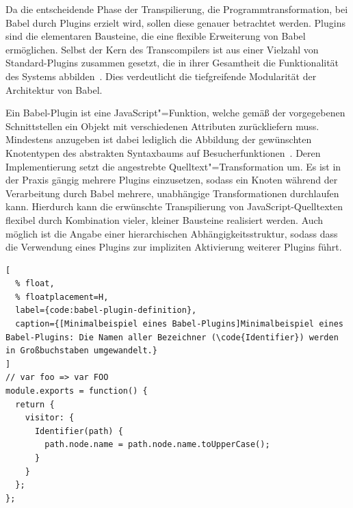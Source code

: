 Da die entscheidende Phase der Transpilierung, die Programmtransformation, bei Babel durch Plugins erzielt wird, sollen diese genauer betrachtet werden. Plugins sind die elementaren Bausteine, die eine flexible Erweiterung von Babel ermöglichen. Selbst der Kern des Transcompilers ist aus einer Vielzahl von Standard-Plugins zusammen gesetzt, die in ihrer Gesamtheit die Funktionalität des Systems abbilden~\autocite{BABEL}. Dies verdeutlicht die tiefgreifende Modularität der Architektur von Babel.

Ein Babel-Plugin ist eine JavaScript"=Funktion, welche gemäß der vorgegebenen Schnittstellen ein Objekt mit verschiedenen Attributen zurückliefern muss. Mindestens anzugeben ist dabei lediglich die Abbildung der gewünschten Knotentypen des abstrakten Syntaxbaums auf Besucherfunktionen~\autocite{BABEL:HANDBOOK}. Deren Implementierung setzt die angestrebte Quelltext"=Transformation um. Es ist in der Praxis gängig mehrere Plugins einzusetzen, sodass ein Knoten während der Verarbeitung durch Babel mehrere, unabhängige Transformationen durchlaufen kann. Hierdurch kann die erwünschte Transpilierung von JavaScript-Quelltexten flexibel durch Kombination vieler, kleiner Bausteine realisiert werden. Auch möglich ist die Angabe einer hierarchischen Abhängigkeitsstruktur, sodass dass die Verwendung eines Plugins zur impliziten Aktivierung weiterer Plugins führt.

\begin{lstlisting}[
  % float,
  % floatplacement=H,
  label={code:babel-plugin-definition},
  caption={[Minimalbeispiel eines Babel-Plugins]Minimalbeispiel eines Babel-Plugins: Die Namen aller Bezeichner (\code{Identifier}) werden in Großbuchstaben umgewandelt.}
]
// var foo => var FOO
module.exports = function() {
  return {
    visitor: {
      Identifier(path) {
        path.node.name = path.node.name.toUpperCase();
      }
    }
  };
};
\end{lstlisting}

